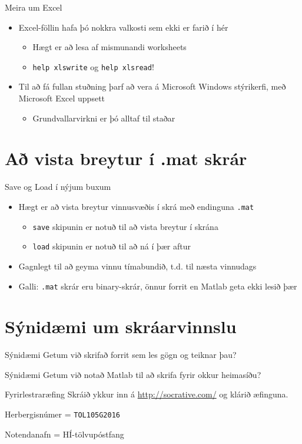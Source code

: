 \documentclass{beamer}
\begin{document}
\begin{frame}{Meira um Excel}
\begin{itemize}
 \item Excel-föllin hafa þó nokkra valkosti sem ekki er farið í hér
 \begin{itemize}
  \item Hægt er að lesa af mismunandi worksheets
  \item \texttt{help xlswrite} og \texttt{help xlsread}!
 \end{itemize}
 \item Til að fá fullan stuðning þarf að vera á Microsoft Windows stýrikerfi, með Microsoft Excel uppsett
 \begin{itemize}
  \item Grundvallarvirkni er þó alltaf til staðar
 \end{itemize}
\end{itemize}
\end{frame}

\section{Að vista breytur í .mat skrár}

\begin{frame}{Save og Load í nýjum buxum}
\begin{itemize}
 \item Hægt er að vista breytur vinnusvæðis í skrá með endinguna \texttt{.mat}
 \begin{itemize}
  \item \texttt{save} skipunin er notuð til að vista breytur í skrána
  \item \texttt{load} skipunin er notuð til að ná í þær aftur
 \end{itemize}
 \item Gagnlegt til að geyma vinnu tímabundið, t.d. til næsta vinnudags
 \item Galli: \texttt{.mat} skrár eru binary-skrár, önnur forrit en Matlab geta ekki lesið þær
\end{itemize}
\end{frame}

\section{Sýnidæmi um skráarvinnslu}

\begin{frame}{Sýnidæmi}
Getum við skrifað forrit sem les gögn og teiknar þau?
\end{frame}

\begin{frame}{Sýnidæmi}
Getum við notað Matlab til að skrifa fyrir okkur heimasíðu?
\end{frame}

\begin{frame}{Fyrirlestraræfing}
Skráið ykkur inn á \url{http://socrative.com/} og klárið æfinguna.

Herbergisnúmer = \texttt{TOL105G2016}

Notendanafn = HÍ-tölvupóstfang
\end{frame}
\end{document}
